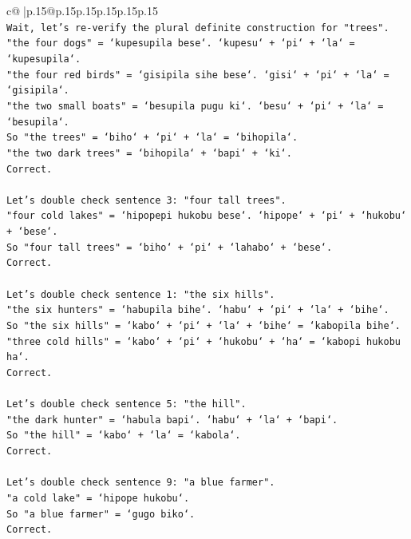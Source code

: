 \documentclass{article}
\begin{document}
{\begin{supertabular}{c@{$\;$}|p{.15\linewidth}@{}p{.15\linewidth}p{.15\linewidth}p{.15\linewidth}p{.15\linewidth}p{.15\linewidth}}
{{{\\ 
\texttt{Wait, let's re{-}verify the plural definite construction for "trees".} \\
\texttt{"the four dogs" = `kupesupila bese`. `kupesu` + `pi` + `la` = `kupesupila`.} \\
\texttt{"the four red birds" = `gisipila sihe bese`. `gisi` + `pi` + `la` = `gisipila`.} \\
\texttt{"the two small boats" = `besupila pugu ki`. `besu` + `pi` + `la` = `besupila`.} \\
\texttt{So "the trees" = `biho` + `pi` + `la` = `bihopila`.} \\
\texttt{"the two dark trees" = `bihopila` + `bapi` + `ki`.} \\
\texttt{Correct.} \\
\\ 
\texttt{Let's double check sentence 3: "four tall trees".} \\
\texttt{"four cold lakes" = `hipopepi hukobu bese`. `hipope` + `pi` + `hukobu` + `bese`.} \\
\texttt{So "four tall trees" = `biho` + `pi` + `lahabo` + `bese`.} \\
\texttt{Correct.} \\
\\ 
\texttt{Let's double check sentence 1: "the six hills".} \\
\texttt{"the six hunters" = `habupila bihe`. `habu` + `pi` + `la` + `bihe`.} \\
\texttt{So "the six hills" = `kabo` + `pi` + `la` + `bihe` = `kabopila bihe`.} \\
\texttt{"three cold hills" = `kabo` + `pi` + `hukobu` + `ha` = `kabopi hukobu ha`.} \\
\texttt{Correct.} \\
\\ 
\texttt{Let's double check sentence 5: "the hill".} \\
\texttt{"the dark hunter" = `habula bapi`. `habu` + `la` + `bapi`.} \\
\texttt{So "the hill" = `kabo` + `la` = `kabola`.} \\
\texttt{Correct.} \\
\\ 
\texttt{Let's double check sentence 9: "a blue farmer".} \\
\texttt{"a cold lake" = `hipope hukobu`.} \\
\texttt{So "a blue farmer" = `gugo biko`.} \\
\texttt{Correct.} \\
}}}
\end{supertabular}}
\end{document}
